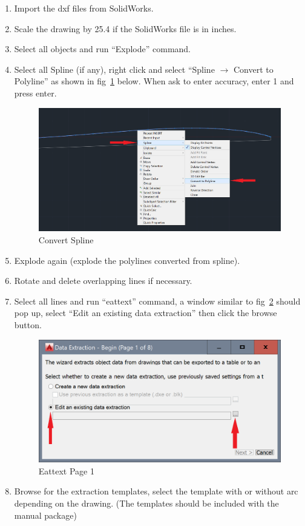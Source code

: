 \documentclass[titlepage,10pt,letter]{report}
\numberwithin{equation}{chapter}
\begin{document}
\begin{enumerate}[noitemsep,topsep=0pt]
	\item Import the dxf files from SolidWorks.
	\item Scale the drawing by 25.4 if the SolidWorks file is in inches.
	\item Select all objects and run ``Explode'' command.
	\item Select all Spline (if any), right click and select ``Spline $\rightarrow$ Convert to Polyline'' as shown in fig~\ref{fig:cad3} below. When ask to enter accuracy, enter 1 and press enter.
	\begin{figure} [H]
		\includegraphics[width = 0.9\linewidth]{./Figures/general_shape/cad3.png}
		\caption{Convert Spline}
		\label{fig:cad3}
	\end{figure}
	\item Explode again (explode the polylines converted from spline).
	\item Rotate and delete overlapping lines if necessary.
	\item Select all lines and run ``eattext'' command, a window similar to fig~\ref{fig:cad4} should pop up, select ``Edit an existing data extraction'' then click the browse button.
	\begin{figure} [H]
		\includegraphics[width = 0.6\linewidth]{./Figures/general_shape/cad4.png}
		\caption{Eattext Page 1}
		\label{fig:cad4}
	\end{figure}
	\item Browse for the extraction templates, select the template with or without arc depending on the drawing. (The templates should be included with the manual package)

\end{enumerate}
\end{document}

